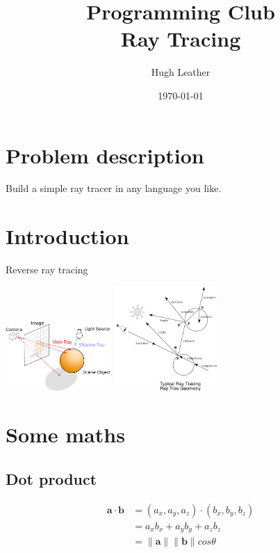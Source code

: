 \documentclass{article}
\title{
    \textbf{Programming Club}\\
    Ray Tracing \\
}
\author{Hugh Leather}
\date{\today}
\begin{document}
    \maketitle

\setlength{\parskip}{1em}
\setlength{\parindent}{0em}

    \section{Problem description}
        Build a simple ray tracer in any language you like.
            
    \section{Introduction}
        Reverse ray tracing 
        
        \includegraphics[width=0.3\textwidth]{tracing}
        \includegraphics[width=0.3\textwidth]{tree}
    
    \section{Some maths}
        \subsection{Dot product}
            \begin{align*}
                \mathbf{a} \cdot \mathbf{b} &= (a_x,a_y,a_z) \cdot (b_x,b_y,b_z)\\
                                            &= a_xb_x + a_yb_y + a_zb_z\\
                                            &= \lVert\mathbf{a}\rVert \lVert\mathbf{b}\rVert cos \theta
            \end{align*}
\end{document}
